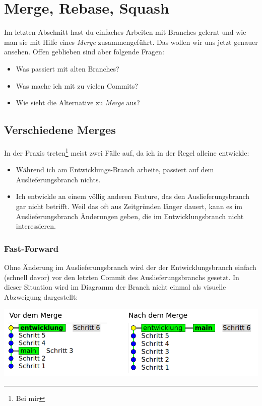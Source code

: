 \documentclass[
  letterpaper,
  DIV=11]{scrreprt}
\providecommand{\tightlist}{%
  \setlength{\itemsep}{0pt}\setlength{\parskip}{0pt}}\usepackage{longtable,booktabs,array}
\begin{document}

\chapter{Merge, Rebase, Squash}\label{merge-rebase-squash}

Im letzten Abschnitt hast du einfaches Arbeiten mit Branches gelernt und
wie man sie mit Hilfe eines \emph{Merge} zusammengeführt. Das wollen wir
uns jetzt genauer ansehen. Offen geblieben sind aber folgende Fragen:

\begin{itemize}
\tightlist
\item
  Was passiert mit alten Branches?
\item
  Was mache ich mit zu vielen Commits?
\item
  Wie sieht die Alternative zu \emph{Merge} aus?
\end{itemize}

\section{Verschiedene Merges}\label{verschiedene-merges}

In der Praxis treten\footnote{Bei mir} meist zwei Fälle auf, da ich in
der Regel alleine entwickle:

\begin{itemize}
\tightlist
\item
  Während ich am Entwicklungs-Branch arbeite, passiert auf dem
  Auslieferungsbranch nichts.
\item
  Ich entwickle an einem völlig anderen Feature, das den
  Auslieferungsbranch gar nicht betrifft. Weil das oft aus Zeitgründen
  länger dauert, kann es im Auslieferungsbranch Änderungen geben, die im
  Entwicklungsbranch nicht interessieren.
\end{itemize}

\subsection{Fast-Forward}\label{fast-forward}

Ohne Änderung im Auslieferungsbranch wird der der Entwicklungsbranch
einfach (schnell davor) vor den letzten Commit des Auslieferungsbranchs
gesetzt. In dieser Situation wird im Diagramm der Branch nicht einmal
als visuelle Abzweigung dargestellt:

\includegraphics[width=16cm,height=\textheight]{bilder/bash/fast_forward.png}
\end{document}
